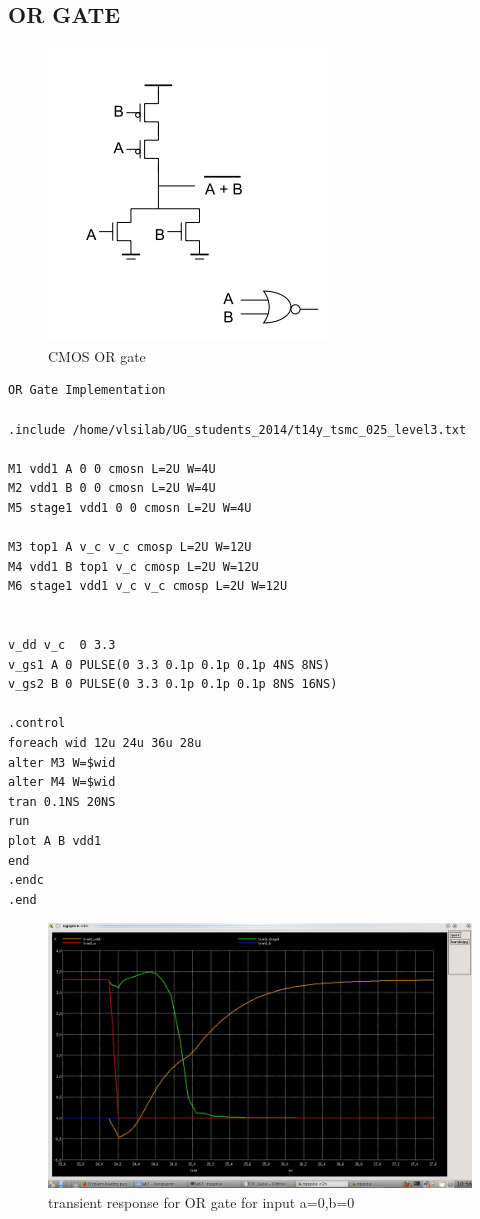 \documentclass[12pt,a4paper]{article}
\begin{document}
\begin{center}
\vspace{10pt}

\subsection{OR GATE}

\begin{figure}[h]
\centering
\includegraphics[scale=.7]{cmos_nor_gate.jpg}
\caption[Short]{CMOS OR gate }
\end{figure}
 

\begin{lstlisting}
OR Gate Implementation

.include /home/vlsilab/UG_students_2014/t14y_tsmc_025_level3.txt

M1 vdd1 A 0 0 cmosn L=2U W=4U
M2 vdd1 B 0 0 cmosn L=2U W=4U
M5 stage1 vdd1 0 0 cmosn L=2U W=4U 

M3 top1 A v_c v_c cmosp L=2U W=12U 
M4 vdd1 B top1 v_c cmosp L=2U W=12U
M6 stage1 vdd1 v_c v_c cmosp L=2U W=12U  


v_dd v_c  0 3.3
v_gs1 A 0 PULSE(0 3.3 0.1p 0.1p 0.1p 4NS 8NS)
v_gs2 B 0 PULSE(0 3.3 0.1p 0.1p 0.1p 8NS 16NS)

.control
foreach wid 12u 24u 36u 28u
alter M3 W=$wid
alter M4 W=$wid
tran 0.1NS 20NS
run
plot A B vdd1
end
.endc
.end
\end{lstlisting}

\begin{figure}[h]
\centering
\includegraphics[scale=.4]{OR_Gate_00.jpeg}
\caption[Short]{transient response for OR gate for input a=0,b=0 }
\end{figure}


\end{center}
\end{document}
